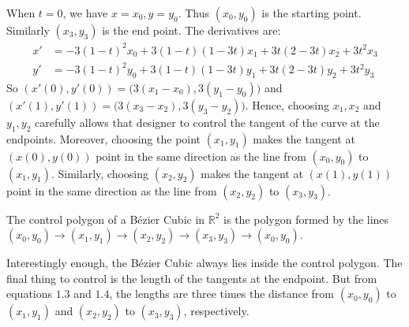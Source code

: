                When $t=0$, we have $x = x_0, y=y_0$.
                Thus $(x_0,y_0)$ is the starting point.
                Similarly $(x_3,y_3)$ is the end point.
                The derivatives are:
                \begin{align*}
                    x'&=-3(1-t)^2x_0
                       +3(1-t)(1-3t)x_1
                       +3t(2-3t)x_2
                       +3t^2x_3 \\
                    y'&=-3(1-t)^2y_0
                       +3(1-t)(1-3t)y_1
                       +3t(2-3t)y_2
                       +3t^2y_3
                \end{align*}
                So $(x'(0),y'(0))=\big(3(x_1-x_0),3(y_1-y_0)\big)$
                and $(x'(1),y'(1))=\big(3(x_3-x_2),3(y_3-y_2)\big)$.
                Hence, choosing $x_1,x_2$ and $y_1,y_2$ carefully
                allows that designer to control the tangent of the
                curve at the endpoints. Moreover, choosing the point
                $(x_1,y_1)$ makes the tangent at $(x(0),y(0))$ point
                in the same direction as the line from $(x_0,y_0)$
                to $(x_1,y_1)$. Similarly, choosing $(x_2,y_2)$ makes
                the tangent at $(x(1),y(1))$ point in the same
                direction as the line from
                $(x_2,y_2)$ to $(x_3,y_3)$.
                \begin{definition}
                    The control polygon of a B\'{e}zier Cubic
                    in $\mathbb{R}^2$ is the polygon formed
                    by the lines
                    $(x_0,y_0)\rightarrow(x_1,y_1)%
                     \rightarrow(x_2,y_2)\rightarrow(x_3,y_3)%
                     \rightarrow (x_0,y_0)$.
                \end{definition}
                Interestingly enough, the B\'{e}zier Cubic always
                lies inside the control polygon. The final thing
                to control is the length of the tangents at the
                endpoint. But from equations $1.3$ and $1.4$, the
                lengths are three times the distance from
                $(x_0,y_0)$ to $(x_1,y_1)$ and $(x_2,y_2)$ to
                $(x_3,y_3)$, respectively. 

